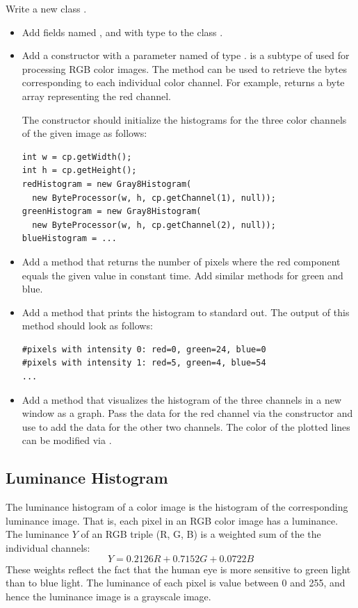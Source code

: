 \documentclass{book}
\begin{document}
\begin{exercise}
Write a new class .
\begin{itemize}
  \item  Add fields named ,  and  with type  to the class .
  \item Add a constructor with a parameter named  of type .  is a subtype of  used for processing RGB color images. The method  can be used to retrieve the bytes corresponding to each individual color channel. For example,  returns a byte array representing the red channel.
  
 The constructor should initialize the histograms for the three color channels of the given image as follows:
  \begin{lstlisting}
int w = cp.getWidth();
int h = cp.getHeight();
redHistogram = new Gray8Histogram(
  new ByteProcessor(w, h, cp.getChannel(1), null));
greenHistogram = new Gray8Histogram(
  new ByteProcessor(w, h, cp.getChannel(2), null));
blueHistogram = ...
  \end{lstlisting}
   \item Add a method  that returns the number of pixels where the red component equals the given value in constant time. Add similar methods for green and blue.
  \item Add a method  that prints the histogram to standard out. The output of this method should look as follows:
\begin{verbatim}
#pixels with intensity 0: red=0, green=24, blue=0  
#pixels with intensity 1: red=5, green=4, blue=54 
...
\end{verbatim}
 \item Add a method  that visualizes the histogram of the three channels in a new window as a graph. Pass the data for the red channel via the constructor and use  to add the data for the other two channels. The color of the plotted lines can be modified via . 
\end{itemize}
\end{exercise}

\subsection{Luminance Histogram}
The luminance histogram of a color image is the histogram of the corresponding luminance image. That is, each pixel in an RGB color image has a luminance. The luminance $Y$ of an RGB triple (R, G, B) is a weighted sum of the the individual channels:
$$Y =  0.2126 R + 0.7152 G + 0.0722 B$$
These weights reflect the fact that the human eye is more sensitive to green light than to blue light. The luminance of each pixel is value between 0 and 255, and hence the luminance image is a grayscale image.
\end{document}
